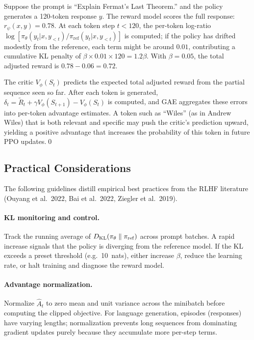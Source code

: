 \begin{example}
\label{ex:ppo-rlhf}
Suppose the prompt is ``Explain Fermat's Last Theorem.'' and the policy
generates a 120-token response $y$.  The reward model scores the full
response: $r_\psi(x,y) = 0.78$.  At each token step $t < 120$, the
per-token log-ratio $\log[\pi_\theta(y_t|x,y_{<t})/\pi_{\mathrm{ref}}(y_t|x,y_{<t})]$
is computed; if the policy has drifted modestly from the reference, each
term might be around $0.01$, contributing a cumulative KL penalty of
$\beta \times 0.01 \times 120 = 1.2\beta$.  With $\beta = 0.05$, the
total adjusted reward is $0.78 - 0.06 = 0.72$.

The critic $V_\phi(S_t)$ predicts the expected total adjusted reward from
the partial sequence seen so far.  After each token is generated,
$\delta_t = \tilde{R}_t + \gamma V_\phi(S_{t+1}) - V_\phi(S_t)$ is computed,
and GAE aggregates these errors into per-token advantage estimates.
A token such as ``Wiles'' (as in Andrew Wiles) that is both relevant and
specific may push the critic's prediction upward, yielding a positive
advantage that increases the probability of this token in future PPO
updates.\qed
\end{example}

\subsection{Practical Considerations}

The following guidelines distill empirical best practices from the RLHF
literature (Ouyang et al.\ 2022, Bai et al.\ 2022, Ziegler et al.\ 2019).

\paragraph{KL monitoring and control.}
Track the running average of $D_{\mathrm{KL}}\!\left(\pi_\theta\;\|\;\pi_{\mathrm{ref}}\right)$ across
prompt batches.  A rapid increase signals that the policy is diverging from
the reference model.  If the KL exceeds a preset threshold (e.g.\ 10~nats),
either increase $\beta$, reduce the learning rate, or halt training and
diagnose the reward model.

\paragraph{Advantage normalization.}
Normalize $\hat{A}_t$ to zero mean and unit variance across the minibatch
before computing the clipped objective.  For language generation, episodes
(responses) have varying lengths; normalization prevents long sequences
from dominating gradient updates purely because they accumulate more per-step
terms.

